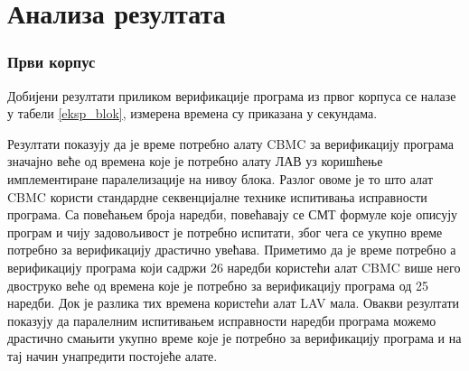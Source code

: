\documentclass[12pt,oneside]{memoir}
\begin{document}
 
  
 \section{Анализа резултата}
	
 \subsubsection{Први корпус} 
  Добијени резултати приликом верификације програма из првог корпуса се налазе у табели \ref{eksp_blok}, измерена времена су приказана у секундама. 
  
  Резултати показују да је време потребно алату CBMC за верификацију програма значајно веће од времена које је потребно алату ЛАВ уз коришћење имплементиране паралелизације на нивоу блока. Разлог овоме је то што алат CBMC користи стандардне секвенцијалне технике испитивања исправности програма. Са повећањем броја наредби, повећавају се СМТ формуле које описују програм и чију задовољивост је потребно испитати, због чега се укупно време потребно за верификацију драстично увећава. Приметимо да је време потребно а верификацију програма који садржи 26 наредби користећи алат CBMC више него двоструко веће од времена које је потребно за верификацију програма од 25 наредби. Док је разлика тих времена користећи алат LAV мала. Овакви резултати показују да паралелним испитивањем исправности наредби програма можемо драстично смањити укупно време које је потребно за верификацију програма и на тај начин унапредити постојеће алате.
  
\end{document}
